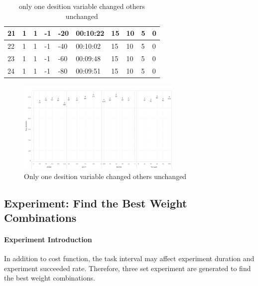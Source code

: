 \begin{table}[]
{\begin{tabular}{|l|l|l|l|l|l|l|l|l|l|}
21      & 1       & 1        & -1      & -20     & 00:10:22 & 15    & 10        & 5       & 0        \\ \hline
22      & 1       & 1        & -1      & -40     & 00:10:02 & 15    & 10        & 5       & 0        \\ \hline
23      & 1       & 1        & -1      & -60     & 00:09:48 & 15    & 10        & 5       & 0        \\ \hline
24      & 1       & 1        & -1      & -80     & 00:09:51 & 15    & 10        & 5       & 0        \\ \hline
\end{tabular}}
\caption{only one desition variable changed others unchanged}
\label{tab:only_one_desition_variable_changed}
\end{table}

\begin{figure}[htbp]
    \centering
    \includegraphics[width = 0.7\textwidth]{content/images/ch5/one_decision_variable.png}
    \caption{Only one desition variable changed others unchanged}
    \label{fig:only_one_desition_variable_changed}
\end{figure}

\subsection{Experiment: Find the Best Weight Combinations}
\paragraph{Experiment Introduction}
In addition to cost function, the task interval may affect experiment duration and experiment succeeded rate. Therefore, three set experiment are generated to find the best weight combinations. 
 
